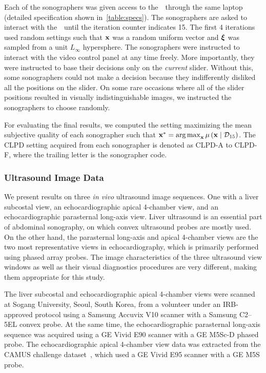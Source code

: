 Each of the sonographers was given access to the~\usdg~through the same laptop (detailed specification shown in~\cref{table:specs}).
The sonographers are asked to interact with the~\usdg~until the iteration counter indicates 15.
The first 4 iterations used random settings such that \(\mathbf{x}\) was a random uniform vector and \(\bm{\xi}\) was sampled from a unit \(L_{\infty}\) hypersphere.
The sonographers were instructed to interact with the video control panel at any time freely.
More importantly, they were instructed to base their decisions only on the \textit{current} slider.
Without this, some sonographers could not make a decision because they indifferently disliked all the positions on the slider.
On some rare occasions where all of the slider positions resulted in visually indistinguishable images, we instructed the sonographers to choose randomly.

For evaluating the final results, we computed the setting maximizing the mean subjective quality of each sonographer such that \( \mathbf{x}^* = \operatorname*{arg\,max}_{\mathbf{x}} \mu\left(\mathbf{x} \mid \mathcal{D}_{15} \right) \).
The CLPD setting acquired from each sonographer is denoted as CLPD-A to CLPD-F, where the trailing letter is the sonographer code.


\subsubsection{Ultrasound Image Data}\label{section:data}
We present results on three \textit{in vivo} ultrasound image sequences.
One with a liver subcostal view, an echocardiographic apical 4-chamber view, and an echocardiographic parasternal long-axis view.
Liver ultrasound is an essential part of abdominal sonography, on which convex ultrasound probes are mostly used.
On the other hand, the parasternal long-axis and apical 4-chamber views are the two most representative views in echocardiography, which is primarily performed using phased array probes.
The image characteristics of the three ultrasound view windows as well as their visual diagnostics procedures are very different, making them appropriate for this study.

The liver subcostal and echocardiographic apical 4-chamber views were scanned at Sogang University, Seoul, South Korea, from a volunteer under an IRB-approved protocol using a Samsung Accuvix V10 scanner with a Samsung C2--5EL convex probe. At the same time, the echocardiographic parasternal long-axis sequence was acquired using a GE Vivid E90 scanner with a GE M5Sc-D phased probe.
The echocardiographic apical 4-chamber view data was extracted from the CAMUS challenge dataset~\cite{leclerc_deep_2019}, which used a GE Vivid E95 scanner with a GE M5S probe.

